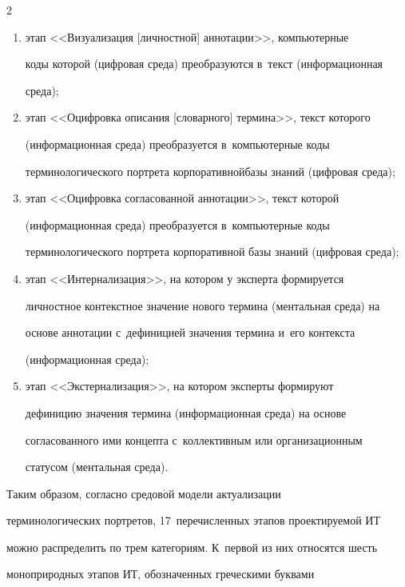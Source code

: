 \begin{multicols}{2}
\begin{enumerate}[(1)]
терминологического портрета корпоративной базы знаний (циф\-ро\-вая среда);

  \item этап <<Визуализация [личностной] аннотации>>, компьютерные 

коды которой (циф\-ро\-вая среда) преобразуются в~текст (информационная 

среда);

  \item этап <<Оцифровка описания [словарного] термина>>, текст которого 

(информационная среда) преобразуется в~компьютерные коды 

терминологического портрета корпоративной\linebreak базы знаний (циф\-ро\-вая среда);

  \item этап <<Оцифровка согласованной аннотации>>, текст которой 

(информационная среда) преобразуется в~компьютерные коды 

терминологического портрета корпоративной базы знаний (циф\-ро\-вая среда);

  \item этап <<Интернализация>>, на котором у эксперта формируется 

личностное контекстное значение нового термина (ментальная среда) на 

основе аннотации с~дефиницией значения термина и~его контекста 

(информационная среда);

  \item этап <<Экстернализация>>, на котором эксперты формируют 

дефиницию значения термина (информационная среда) на основе 

согласованного ими концепта с~коллективным или организационным 

статусом (ментальная среда).

  \end{enumerate}

  

  Таким образом, согласно средов$\acute{\mbox{о}}$й модели актуализации 

терминологических портретов, 17~перечисленных этапов проектируемой ИТ 

можно распределить по трем категориям. К~первой из них относятся шесть 

моноприродных этапов ИТ, обозначенных греческими буквами  


\end{multicols}
